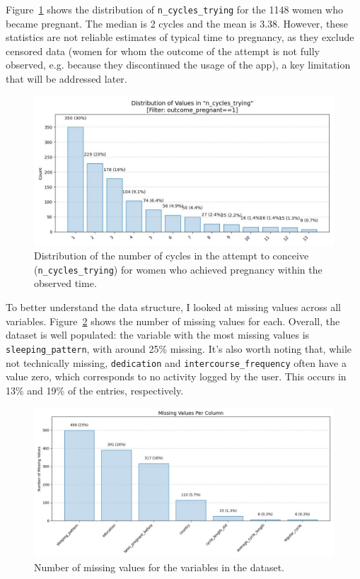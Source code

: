\documentclass[11pt]{article}
\begin{document}
Figure~\ref{fig:n_cycles_trying__outcome_pregnant_1} shows the distribution of \texttt{n\_cycles\_trying} for the 1148 women who became pregnant. The median is 2 cycles and the mean is 3.38. However, these statistics are not reliable estimates of typical time to pregnancy, as they exclude censored data (women for whom the outcome of the attempt is not fully observed, e.g. because they discontinued the usage of the app), a key limitation that will be addressed later.

\begin{figure}
  \centering
  \includegraphics[width=0.65\linewidth]{plots/n_cycles_trying__outcome_pregnant_1.jpg}
  \caption{
    Distribution of the number of cycles in the attempt to conceive (\texttt{n\_cycles\_trying}) for women who achieved pregnancy within the observed time.\\} 
    \label{fig:n_cycles_trying__outcome_pregnant_1}
\end{figure}

To better understand the data structure, I looked at missing values across all variables. Figure~\ref{fig:missing_values} shows the number of missing values for each. Overall, the dataset is well populated: the variable with the most missing values is \texttt{sleeping\_pattern}, with around 25\% missing. It’s also worth noting that, while not technically missing, \texttt{dedication} and \texttt{intercourse\_frequency} often have a value zero, which corresponds to no activity logged by the user. This occurs in 13\% and 19\% of the entries, respectively.

\begin{figure}
  \centering
  \includegraphics[width=0.65\linewidth]{plots/missing_values.jpg}
  \caption{
  Number of missing values for the variables in the dataset.\\
  } 
    \label{fig:missing_values}
\end{figure}
\end{document}
